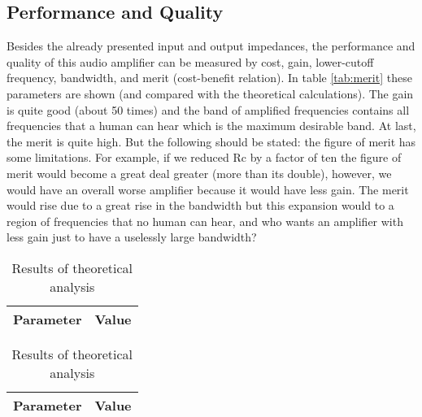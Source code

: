 \subsection{Performance and Quality}
Besides the already presented input and output impedances, the performance and quality of this audio amplifier can be measured by cost, gain, lower-cutoff frequency, bandwidth, and merit (cost-benefit relation). In table \ref{tab:merit} these parameters are shown (and compared with the theoretical calculations). The gain is quite good (about 50 times) and the band of amplified frequencies contains all frequencies that a human can hear which is the maximum desirable band. At last, the merit is quite high. But the following should be stated: the figure of merit has some limitations. For example, if we reduced Rc by a factor of ten the figure of merit would become a great deal greater (more than its double), however, we would have an overall worse amplifier because it would have less gain. The merit would rise due to a great rise in the bandwidth but this expansion would to a region of frequencies that no human can hear, and who wants an amplifier with less gain just to have a uselessly large bandwidth?


\begin{table}[!htb]
  \begin{minipage}{.5\linewidth}
     \centering
  \begin{tabular}{|c|c|}
    \hline    
    {\bf Parameter} & {\bf Value} \\ \hline
    
 \end{tabular}
 \caption{Results of simulation analysis}
 \label{tab:merit}
  \end{minipage}%
    \hspace{2 mm}
    \begin{minipage}{.5\linewidth}
      \centering
        \begin{tabular}{|c|c|}
    \hline    
    {\bf Parameter} & {\bf Value} \\ \hline
    
 \end{tabular}
        \caption{Results of theoretical analysis}
        \label{compmerit}
    \end{minipage} 
\end{table}

\newpage
